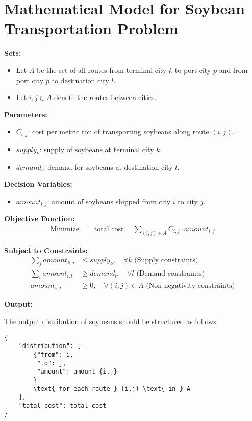\documentclass{article}
\begin{document}
\section*{Mathematical Model for Soybean Transportation Problem}

\textbf{Sets:}
\begin{itemize}
    \item Let $A$ be the set of all routes from terminal city $k$ to port city $p$ and from port city $p$ to destination city $l$.
    \item Let $i, j \in A$ denote the routes between cities.
\end{itemize}

\textbf{Parameters:}
\begin{itemize}
    \item $C_{i,j}$: cost per metric ton of transporting soybeans along route $(i, j)$.
    \item $supply_k$: supply of soybeans at terminal city $k$.
    \item $demand_l$: demand for soybeans at destination city $l$.
\end{itemize}

\textbf{Decision Variables:}
\begin{itemize}
    \item $amount_{i,j}$: amount of soybeans shipped from city $i$ to city $j$.
\end{itemize}

\textbf{Objective Function:}
\begin{align*}
\text{Minimize } & \quad \text{total\_cost} = \sum_{(i,j) \in A} C_{i,j} \cdot amount_{i,j}
\end{align*}

\textbf{Subject to Constraints:}
\begin{align*}
\sum_{j} amount_{k,j} & \leq supply_k, \quad \forall k \text{ (Supply constraints)} \\
\sum_{i} amount_{i,l} & \geq demand_l, \quad \forall l \text{ (Demand constraints)} \\
amount_{i,j} & \geq 0, \quad \forall (i,j) \in A \text{ (Non-negativity constraints)}
\end{align*}

\textbf{Output:} 

The output distribution of soybeans should be structured as follows:
\begin{verbatim}
{
    "distribution": [
        {"from": i,
         "to": j,
         "amount": amount_{i,j}
        }
        \text{ for each route } (i,j) \text{ in } A
    ],
    "total_cost": total_cost
}
\end{verbatim}
\end{document}
